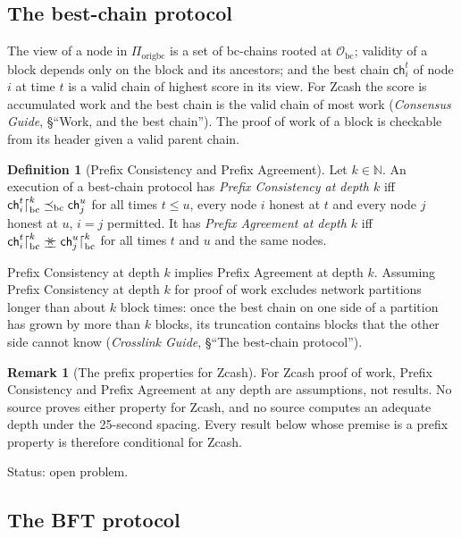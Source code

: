 \documentclass[11pt,a4paper]{article}
\theoremstyle{definition}
\newtheorem{definition}[theorem]{Definition}
\newtheorem{remark}[theorem]{Remark}
\newcommand{\N}{\mathbb{N}}
\newcommand{\bc}{\mathrm{bc}}
\newcommand{\Origin}{\mathcal{O}}
\newcommand{\Obc}{\Origin_{\bc}}
\newcommand{\preceqbc}{\preceq_{\bc}}
\newcommand{\agrees}{\mathrel{\preceq\mkern-9mu\succeq}}
\newcommand{\ch}{\mathsf{ch}}
\newcommand{\Piorigbc}{\Pi_{\mathrm{origbc}}}
\begin{document}
\subsection{The best-chain protocol}\label{sec:sub-bc}

The view of a node in $\Piorigbc$ is a set of bc-chains rooted at $\Obc$;
validity of a block depends only on the block and its ancestors; and the
best chain $\ch_i^t$ of node $i$ at time $t$ is a valid chain of highest
score in its view. For Zcash the score is accumulated work and the best
chain is the valid chain of most work (\emph{Consensus Guide}, \S``Work, and
the best chain''). The proof of work of a block is checkable from its header
given a valid parent chain.

\begin{definition}[Prefix Consistency and Prefix Agreement]\label{def:pa}
Let $k \in \N$. An execution of a best-chain protocol has \emph{Prefix
Consistency at depth $k$} iff $\ch_i^t\trunc[\bc]{k} \preceqbc \ch_j^u$ for
all times $t \le u$, every node $i$ honest at $t$ and every node $j$ honest
at $u$, $i = j$ permitted. It has \emph{Prefix Agreement at depth $k$} iff
$\ch_i^t\trunc[\bc]{k} \agrees \ch_j^u\trunc[\bc]{k}$ for all times $t$ and
$u$ and the same nodes.
\end{definition}

Prefix Consistency at depth $k$ implies Prefix Agreement at depth $k$.
Assuming Prefix Consistency at depth $k$ for proof of work excludes network
partitions longer than about $k$ block times: once the best chain on one side
of a partition has grown by more than $k$ blocks, its truncation contains
blocks that the other side cannot know (\emph{Crosslink Guide}, \S``The
best-chain protocol'').

\begin{remark}[The prefix properties for Zcash]\label{rem:pow-prefix}
For Zcash proof of work, Prefix Consistency and Prefix Agreement at any
depth are assumptions, not results. No source proves either property for
Zcash, and no source computes an adequate depth under the 25-second spacing.
Every result below whose premise is a prefix property is therefore
conditional for Zcash.

Status: open problem.
\end{remark}

\subsection{The BFT protocol}\label{sec:sub-bft}
\end{document}
